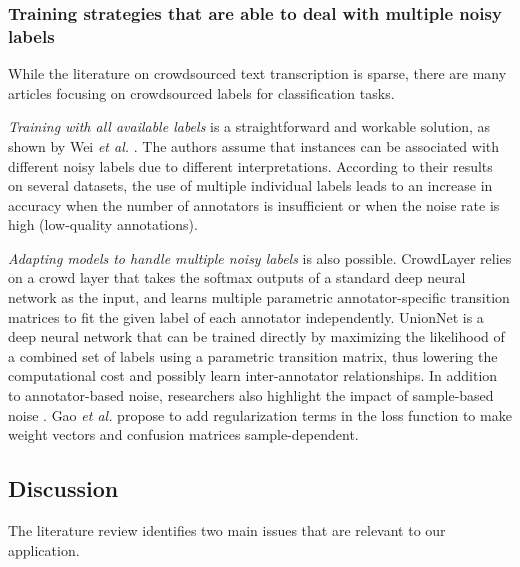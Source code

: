 \documentclass[sigconf]{acmart}
\begin{document}
\subsubsection{Training strategies that are able to deal with multiple noisy labels}





While the literature on crowdsourced text transcription is sparse, there are many articles focusing on crowdsourced labels for classification tasks.

\textit{Training with all available labels} is a straightforward and workable solution, as shown by Wei \textit{et al.} \cite{Wei2022b}. The authors assume that instances can be associated with different noisy labels due to different interpretations. According to their results on several datasets, the use of multiple individual labels leads to an increase in accuracy when the number of annotators is insufficient or when the noise rate is high (low-quality annotations).


\textit{Adapting models to handle multiple noisy labels} is also possible. 
CrowdLayer \cite{rodrigues2017deep} relies on a crowd layer that takes the softmax outputs of a standard deep neural network as the input, and learns multiple parametric annotator-specific transition matrices to fit the given label of each annotator independently. UnionNet \cite{Wei2022} is a deep neural network that can be trained directly by maximizing the likelihood of a combined set of labels using a parametric transition matrix, thus lowering the computational cost and possibly learn inter-annotator relationships.
In addition to annotator-based noise, researchers also highlight the impact of sample-based noise \cite{Gao2022, Wei2021}. Gao \textit{et al.} \cite{Gao2022} propose to add regularization terms in the loss function to make weight vectors and confusion matrices sample-dependent. 
















\subsection{Discussion}
The literature review identifies two main issues that are relevant to our application.
\end{document}
